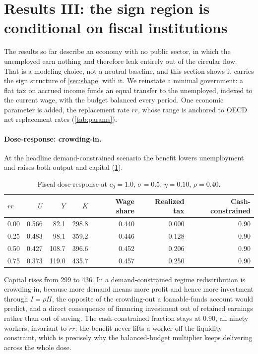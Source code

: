 
\section{Results III: the sign region is conditional on fiscal institutions}
\label{sec:government}

The results so far describe an economy with no public sector, in which the
unemployed earn nothing and therefore leak entirely out of the circular flow.
That is a modeling choice, not a neutral baseline, and this section shows it
carries the sign structure of \cref{sec:shape} with it. We reinstate a minimal
government: a flat tax on accrued income funds an equal transfer to the
unemployed, indexed to the current wage, with the budget balanced every
period. One economic parameter is added, the replacement rate $rr$, whose
range is anchored to OECD net replacement rates (\cref{tab:params}).

\paragraph{Dose-response: crowding-in.} At the headline demand-constrained
scenario the benefit lowers unemployment and raises both output and
capital (\cref{tab:government}).

\begin{table}[htbp]
\centering
\small
\caption{Fiscal dose-response at $c_0 = 1.0$, $\sigma = 0.5$, $\eta = 0.10$,
$\rho = 0.40$.}
\label{tab:government}
\begin{tabular}{lrrrrrr}
\toprule
$rr$ & $U$ & $Y$ & $K$ & Wage share & Realized tax & Cash-constrained\\
\midrule
0.00 & 0.566 & 82.1 & 298.8 & 0.440 & 0.000 & 0.90\\
0.25 & 0.483 & 98.1 & 359.2 & 0.446 & 0.128 & 0.90\\
0.50 & 0.427 & 108.7 & 396.6 & 0.452 & 0.206 & 0.90\\
0.75 & 0.373 & 119.0 & 435.7 & 0.457 & 0.250 & 0.90\\
\bottomrule
\end{tabular}
\end{table}

Capital rises from 299 to 436. In a demand-constrained regime redistribution
is crowding-in, because more demand means more profit and hence more
investment through $I = \rho\Pi$, the opposite of the crowding-out a
loanable-funds account would predict, and a direct consequence of financing
investment out of retained earnings rather than out of saving. The
cash-constrained fraction stays at $0.90$, all ninety workers, invariant to
$rr$: the benefit never lifts a worker off the liquidity constraint, which is
precisely why the balanced-budget multiplier keeps delivering across the whole
dose.

